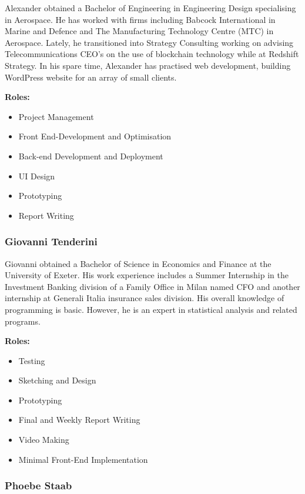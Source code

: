 \documentclass[fontsize=11pt]{extarticle}
\numberwithin{figure}{section} %
\providecommand{\tightlist}{%
  \setlength{\itemsep}{0pt}\setlength{\parskip}{0pt}}
\begin{document}
Alexander obtained a Bachelor of Engineering in Engineering Design
specialising in Aerospace. He has worked with firms including Babcock
International in Marine and Defence and The Manufacturing Technology
Centre (MTC) in Aerospace. Lately, he transitioned into Strategy
Consulting working on advising Telecommunications CEO's on the use of
blockchain technology while at Redshift Strategy. In his spare time,
Alexander has practised web development, building WordPress website for
an array of small clients.

\textbf{Roles:}

\begin{itemize}
\tightlist
\item
  Project Management
\item
  Front End-Development and Optimisation
\item
  Back-end Development and Deployment
\item
  UI Design
\item
  Prototyping
\item
  Report Writing
\end{itemize}

\hypertarget{giovanni-tenderini}{%
\subsubsection{Giovanni Tenderini}\label{giovanni-tenderini}}

Giovanni obtained a Bachelor of Science in Economics and Finance at the
University of Exeter. His work experience includes a Summer Internship
in the Investment Banking division of a Family Office in Milan named CFO
and another internship at Generali Italia insurance sales division. His
overall knowledge of programming is basic. However, he is an expert in
statistical analysis and related programs.

\textbf{Roles:}

\begin{itemize}
\tightlist
\item
  Testing
\item
  Sketching and Design
\item
  Prototyping
\item
  Final and Weekly Report Writing
\item
  Video Making
\item
  Minimal Front-End Implementation
\end{itemize}

\hypertarget{phoebe-staab}{%
\subsubsection{Phoebe Staab}\label{phoebe-staab}}
\end{document}

